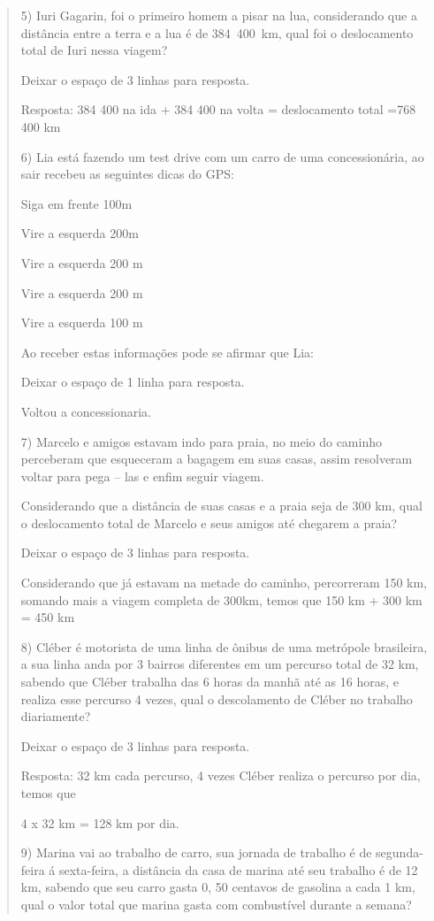 \begin{quote}
\begin{escolha}
5) Iuri Gagarin, foi o primeiro homem a pisar na lua, considerando que a
distância entre a terra e a lua é de 384~400~km, qual foi o deslocamento
total de Iuri nessa viagem?

Deixar o espaço de 3 linhas para resposta.

Resposta: 384 400 na ida + 384 400 na volta = deslocamento total =768
400 km

6) Lia está fazendo um test drive com um carro de uma concessionária, ao
sair recebeu as seguintes dicas do GPS:

Siga em frente 100m

Vire a esquerda 200m

Vire a esquerda 200 m

Vire a esquerda 200 m

Vire a esquerda 100 m

Ao receber estas informações pode se afirmar que Lia:

Deixar o espaço de 1 linha para resposta.

Voltou a concessionaria.

7) Marcelo e amigos estavam indo para praia, no meio do caminho
perceberam que esqueceram a bagagem em suas casas, assim resolveram
voltar para pega -- las e enfim seguir viagem.

Considerando que a distância de suas casas e a praia seja de 300 km,
qual o deslocamento total de Marcelo e seus amigos até chegarem a praia?

Deixar o espaço de 3 linhas para resposta.

Considerando que já estavam na metade do caminho, percorreram 150 km,
somando mais a viagem completa de 300km, temos que 150 km + 300 km = 450
km

8) Cléber é motorista de uma linha de ônibus de uma metrópole
brasileira, a sua linha anda por 3 bairros diferentes em um percurso
total de 32 km, sabendo que Cléber trabalha das 6 horas da manhã até as
16 horas, e realiza esse percurso 4 vezes, qual o descolamento de Cléber
no trabalho diariamente?

Deixar o espaço de 3 linhas para resposta.

Resposta: 32 km cada percurso, 4 vezes Cléber realiza o percurso por
dia, temos que

4 x 32 km = 128 km por dia.

9) Marina vai ao trabalho de carro, sua jornada de trabalho é de
segunda-feira á sexta-feira, a distância da casa de marina até seu
trabalho é de 12 km, sabendo que seu carro gasta 0, 50 centavos de
gasolina a cada 1 km, qual o valor total que marina gasta com
combustível durante a semana?


\end{escolha}
\end{quote}
